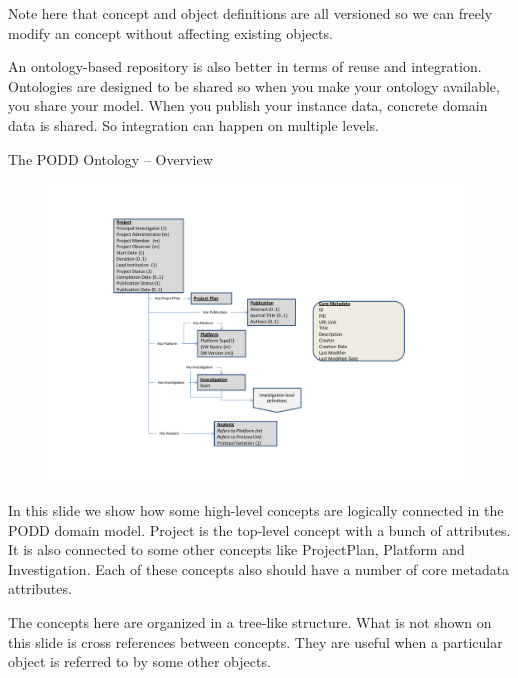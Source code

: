 \documentclass[ignorenonframetext,compress]{beamer}
\begin{document}
Note here that concept and object definitions are all versioned so
we can freely modify an concept without affecting existing objects.

An ontology-based repository is also better in terms of reuse and integration.
Ontologies are designed to be shared so when you make your ontology available,
you share your model. When you publish your instance data, concrete domain data
is shared. So integration can happen on multiple levels. 

\begin{frame}{The PODD Ontology -- Overview}
\vspace{-12pt}
 \begin{figure}[t]
  \begin{center}
  \includegraphics[trim=48mm 30mm 38mm 20mm, clip, width=112mm]{model.pdf}
   \end{center}
  \label{fig:ont}
 \end{figure}
\end{frame}

In this slide we show how some high-level concepts are logically
connected in the PODD domain model. Project is the top-level concept
with a bunch of attributes. It is also connected to some other
concepts like ProjectPlan, Platform and Investigation. Each of these
concepts also should have a number of core metadata attributes.

The concepts here are organized in a tree-like structure. What is not
shown on this slide is cross references between concepts. They are
useful when a particular object is referred to by some other objects.
\end{document}
